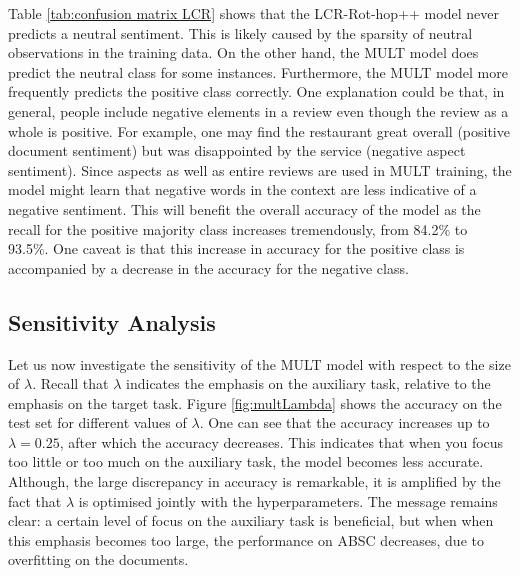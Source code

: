 \documentclass[runningheads]{llncs}
\begin{document}
Table \ref{tab:confusion matrix LCR} shows that the LCR-Rot-hop++ model never predicts a neutral sentiment. This is likely caused by the sparsity of neutral observations in the training data. On the other hand, the MULT model does predict the neutral class for some instances. Furthermore, the MULT model more frequently predicts the positive class correctly. One explanation could be that, in general, people include negative elements in a review even though the review as a whole is positive. For example, one may find the restaurant great overall (positive document sentiment) but was disappointed by the service (negative aspect sentiment). Since aspects as well as entire reviews are used in MULT training, the model might learn that negative words in the context are less indicative of a negative sentiment. This will benefit the overall accuracy of the model as the recall for the positive majority class increases tremendously, from 84.2\% to 93.5\%. One caveat is that this increase in accuracy for the positive class is accompanied by a decrease in the accuracy for the negative class.

\subsection{Sensitivity Analysis}

Let us now investigate the sensitivity of the MULT model with respect to the size of $\lambda$. Recall that $\lambda$ indicates the emphasis on the auxiliary task, relative to the emphasis on the target task. Figure \ref{fig:multLambda} shows the accuracy on the test set for different values of $\lambda$. One can see that the accuracy increases up to $\lambda=0.25$, after which the accuracy decreases. This indicates that when you focus too little or too much on the auxiliary task, the model becomes less accurate. Although, the large discrepancy in accuracy is remarkable, it is amplified by the fact that $\lambda$ is optimised jointly with the hyperparameters. The message remains clear: a certain level of focus on the auxiliary task is beneficial, but when when this emphasis becomes too large, the performance on ABSC decreases, due to overfitting on the documents.
\end{document}
